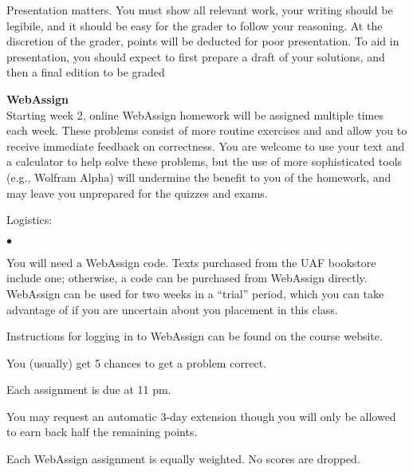 \documentclass[12pt]{article}
\renewcommand{\emph}[1]{\textsf{\textbf{#1}}}
\newcommand{\localhead}[1]{\par\smallskip\textbf{#1}\nobreak\\}%
\def\subheading#1{\localhead{\emph{#1}}}
\newenvironment{clist}%
{\bgroup\parskip 0pt\begin{list}{$\bullet$}{\partopsep 4pt\topsep 0pt\itemsep -2pt}}%
{\end{list}\egroup}%
\begin{document}
Presentation matters. You must show all relevant work, your writing
should be legibile, and it should be easy for the grader to follow
your reasoning. At the discretion of the grader, points will be deducted 
for poor presentation.  To aid in presentation, you should expect
to first prepare a draft of your solutions, and then a final edition to
be graded

\subheading{WebAssign} 
Starting week 2, online WebAssign homework will be assigned multiple times each week. These problems consist of more routine exercises and and allow
you to receive immediate feedback on correctness.  You are welcome
to use your text and a calculator to help solve these problems, but
the use of more sophisticated tools (e.g., Wolfram Alpha) will undermine
the benefit to you of the homework, and may leave you unprepared for
the quizzes and exams.

Logistics:

\begin{clist}
\item You will need a WebAssign code.  Texts purchased from the UAF 
bookstore include one; otherwise, a code can be purchased from
WebAssign directly. WebAssign can be used for two weeks in a ``trial''
period, which you can take advantage of if you are uncertain about
you placement in this class.
\item Instructions for logging in to WebAssign can be found on the course website.
\item You (usually) get 5 chances to get a problem correct. 
\item Each assignment is due at 11 pm. 
\item You may request an automatic 3-day extension though you will only be allowed to earn back half the remaining points. 
\item Each WebAssign assignment is equally weighted. No scores are dropped.
\end{clist}




\end{document}

